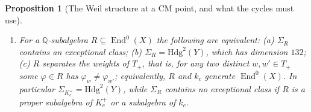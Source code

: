 \documentclass[11pt,reqno]{amsart}
\theoremstyle{plain}
\newtheorem{proposition}[theorem]{Proposition}
\theoremstyle{definition}
\theoremstyle{remark}
\newcommand{\QQ}{\mathbb{Q}}
\newcommand{\Hdg}{\mathrm{Hdg}}
\newcommand{\HW}{W}                      %
\DeclareMathOperator{\End}{End}
\begin{document}
\begin{proposition}[The Weil structure at a CM point, and what the cycles
must use]
\begin{enumerate}[label=\textup{(\roman*)},leftmargin=2.6em,itemsep=2pt]
  every homomorphism $Y\to X$ is of this form. For a $\QQ$-subalgebra
  $R\subseteq\End^{0}(X)$ let $\Sigma_{R}\subseteq\Hdg^{2}(Y)$ be the
  $\QQ$-span of the products of two divisor classes of $Y$ and of the classes
  $f_{\varphi,\psi}^{*}\HW(X)$ with $\varphi,\psi\in R$. Then
  $\Sigma_{k_{c}}=\Sigma_{\QQ}$, the span obtained from the maps
  $(x,y)\mapsto ax+by$ alone, has dimension $110$ and meets the span of
  $\pi_{0},\pi_{12},\pi_{13},\pi_{23}$ in the plane of the classes with
  $a_{1}=a_{2}=a_{3}$; it contains no exceptional class.
\item For a $\QQ$-subalgebra $R\subseteq\End^{0}(X)$ the following are
  equivalent: \textup{(a)} $\Sigma_{R}$ contains an exceptional class;
  \textup{(b)} $\Sigma_{R}=\Hdg^{2}(Y)$, which has dimension $132$;
  \textup{(c)} $R$ separates the weights of $T_{+}$, that is, for any two
  distinct $w,w'\in T_{+}$ some $\varphi\in R$ has
  $\varphi_{w}\ne\varphi_{w'}$; equivalently, $R$ and $k_{c}$ generate
  $\End^{0}(X)$. In particular $\Sigma_{K_{c}^{+}}=\Hdg^{2}(Y)$, while
  $\Sigma_{R}$ contains no exceptional class if $R$ is a proper subalgebra
  of $K_{c}^{+}$ or a subalgebra of $k_{c}$.
\end{enumerate}
\end{proposition}
\end{document}
